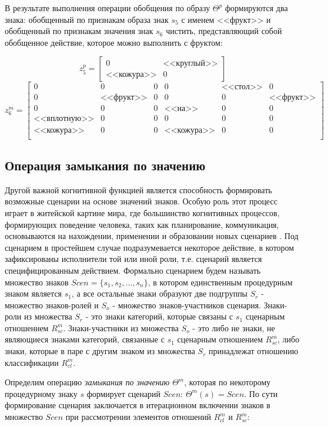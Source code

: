 \documentclass[12pt]{scrartcl}
\begin{document}
	В результате выполнения операции обобщения по образу $\Theta^p$ формируются два знака: обобщенный по признакам образа знак $s_5$ с именем <<фрукт>> и обобщенный по признакам значения знак $s_6$ чистить, представляющий собой обобщенное действие, которое можно выполнить с фруктом:
	
	\[
	z_5^p = \begin{bmatrix}
	0& \text{<<круглый>>} \\
	\text{<<кожура>>} &0
	\end{bmatrix}
	\]
	\[
	z_6^m= \left[\begin{array}{ccc|cccc}
	0&0&0&0&\text{<<стол>>}&0\\
	0&\text{<<фрукт>>}&0& 0&0&\text{<<фрукт>>}\\
	0& 0& 0 &\text{<<на>>} &0&0\\
	\text{<<вплотную>>}& 0& 0 &0 &0&0\\
	\text{<<кожура>>} &0 &0 &\text{<<кожура>>}  &0&0\\
	\end{array}
	\right]
	\] 
	
	\subsection{Операция замыкания по значению}
	Другой важной когнитивной функцией является способность формировать возможные сценарии на основе значений знаков. Особую роль этот процесс играет в житейской картине мира, где большинство когнитивных процессов, формирующих поведение человека, таких как планирование, коммуникация, основываются на нахождении, применении и образовании новых сценариев \cite{Chudova2012b,Osipov2015d}. Под сценарием в простейшем случае подразумевается некоторое действие, в котором зафиксированы исполнители той или иной роли, т.е. сценарий является специфицированным действием. Формально сценарием будем называть множество знаков $Scen=\{s_1,s_2,\dots, s_n\}$, в котором единственным процедурным знаком является $s_1$, а все остальные знаки образуют две подгруппы $S_r$ - множество знаков-ролей и $S_o$ - множество знаков-участников сценария. Знаки-роли из множества $S_r$ - это знаки категорий, которые связаны с $s_1$ сценарным отношением $R_{sc}^m$. Знаки-участники из множества $S_o$ - это либо не знаки, не являющиеся знаками категорий, связанные с $s_1$ сценарным отношением $R_{sc}^m$, либо знаки, которые в паре с другим знаком из множества $S_r$ принадлежат отношению классификации $R_{cl}^m$.
	
	Определим операцию \textit{замыкания по значению} $\Theta^m$, которая по некоторому процедурному знаку $s$ формирует сценарий $Scen$: $\Theta^m(s)=Scen$. По сути формирование сценария заключается в итерационном включении знаков в множество $Scen$ при рассмотрении элементов отношений $R_{cl}^m$ и $R_{sc}^m$:
	
\end{document}
